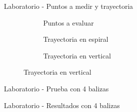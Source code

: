 \documentclass[xcolor=table]{beamer}
\begin{document}
  \begin{frame}{Laboratorio - Puntos a medir y trayectoria}
    \begin{figure}[H]
      \begin{subfigure}[b]{.3\textwidth}
        \centering
        \def\svgwidth{0.85\linewidth}
         
        \caption{Puntos a evaluar}
        \label{fig:puntos}
      \end{subfigure}
      \begin{subfigure}[b]{.3\textwidth}
        \centering
        \def\svgwidth{0.85\linewidth}
         
        \caption{Trayectoria en espiral}
        \label{fig:espiral}
      \end{subfigure}
      \begin{subfigure}[b]{.3\textwidth}
          \centering
          \def\svgwidth{0.85\linewidth}
         
          \caption{Trayectoria en vertical}
          \label{fig:vertical}
        \end{subfigure}
      \label{fig:laboratorio}
      \end{figure}
  \end{frame}

  \begin{frame}{Laboratorio - Prueba con 4 balizas}
    \begin{figure}[H]
      \centering
      \def\svgwidth{0.4\linewidth}
       
      \label{fig:lab_4sens}
    \end{figure}
  \end{frame}

  \begin{frame}{Laboratorio - Resultados con 4 balizas}
    \begin{figure}[H]
      \centering
      \scalebox{0.6}{}
      \label{fig:res_4_lab}
  \end{figure}
  \end{frame}
  
\end{document}
